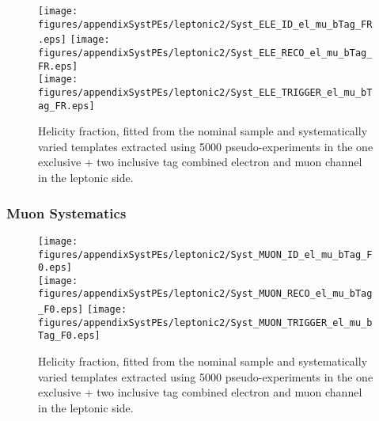 \begin{figure}[!hb]
\begin{center}
        \texttt{[image: figures/appendixSystPEs/leptonic2/Syst\_ELE\_ID\_el\_mu\_bTag\_FR.eps]}
        \texttt{[image: figures/appendixSystPEs/leptonic2/Syst\_ELE\_RECO\_el\_mu\_bTag\_FR.eps]}\\
        \texttt{[image: figures/appendixSystPEs/leptonic2/Syst\_ELE\_TRIGGER\_el\_mu\_bTag\_FR.eps]}
\caption{Helicity fraction, \fr fitted from the nominal \ttbar sample and systematically varied templates extracted using 5000 pseudo-experiments in the one exclusive + two inclusive \bt tag combined electron and muon channel in the leptonic side. }
\label{fig:systematicVar_lep_FR_elmu2incl_ELE}
\end{center}
\end{figure}

\clearpage
\subsubsection{Muon Systematics}
\begin{figure}[!hb]
\begin{center}
        \texttt{[image: figures/appendixSystPEs/leptonic2/Syst\_MUON\_ID\_el\_mu\_bTag\_F0.eps]}\\
        \texttt{[image: figures/appendixSystPEs/leptonic2/Syst\_MUON\_RECO\_el\_mu\_bTag\_F0.eps]}
        \texttt{[image: figures/appendixSystPEs/leptonic2/Syst\_MUON\_TRIGGER\_el\_mu\_bTag\_F0.eps]}        
\caption{Helicity fraction, \fo fitted from the nominal \ttbar sample and systematically varied templates extracted using 5000 pseudo-experiments in the one exclusive + two inclusive \bt tag combined electron and muon channel in the leptonic side. }
\label{fig:systematicVar_lep_f0_elmu2incl_MUON}
\end{center}
\end{figure}

